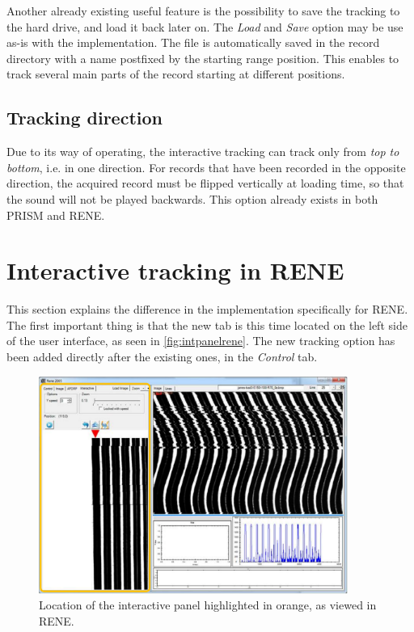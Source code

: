 Another already existing useful feature is the possibility to save the tracking to the hard drive, and load it back later on. The \emph{Load} and \emph{Save} option may be use as-is with the implementation. The file is automatically saved in the record directory with a name postfixed by the starting range position. This enables to track several main parts of the record starting at different positions.

\subsection{Tracking direction}

Due to its way of operating, the interactive tracking can track only from \emph{top to bottom}, i.e. in one direction. For records that have been recorded in the opposite direction, the acquired record must be flipped vertically at loading time, so that the sound will not be played backwards. This option already exists in both PRISM and RENE.

\section{Interactive tracking in RENE}
\label{sec:inttrackrene}

This section explains the difference in the implementation specifically for RENE. The first important thing is that the new tab is this time located on the left side of the user interface, as seen in \autoref{fig:intpanelrene}. The new tracking option has been added directly after the existing ones, in the \emph{Control} tab.

\begin{figure}[!ht]
\centering
\includegraphics[width=0.9\textwidth]{images/int-right-panel-rene}
\caption[Location of the interactive panel in RENE.]
{Location of the interactive panel highlighted in orange, as viewed in RENE.}
\label{fig:intpanelrene}
\end{figure}